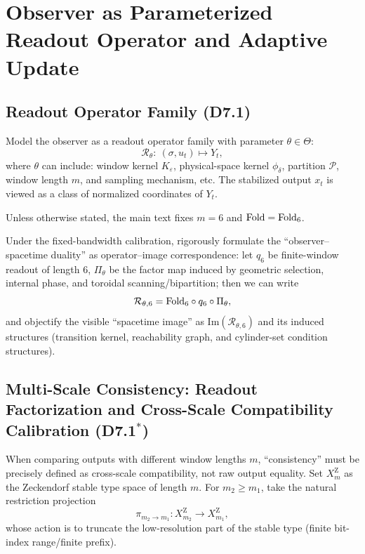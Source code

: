 \section{Observer as Parameterized Readout Operator and Adaptive Update}

\subsection{Readout Operator Family (D7.1)}

Model the observer as a readout operator family with parameter $\theta\in\Theta$:
\[
\mathcal{R}_{\theta}:\ (\sigma,u_t)\mapsto Y_t,
\]
where $\theta$ can include: window kernel $K_{\varepsilon}$, physical-space kernel $\phi_{\delta}$, partition $\mathcal{P}$, window length $m$, and sampling mechanism, etc. The stabilized output $x_t$ is viewed as a class of normalized coordinates of $Y_t$.

\begin{assumption}\label{assump:m6-fixed-framework}
Unless otherwise stated, the main text fixes $m=6$ and $\mathrm{Fold}=\mathrm{Fold}_6$.
\end{assumption}

Under the fixed-bandwidth calibration, rigorously formulate the ``observer--spacetime duality'' as operator--image correspondence: let $q_6$ be finite-window readout of length $6$, $\Pi_{\theta}$ be the factor map induced by geometric selection, internal phase, and toroidal scanning/bipartition; then we can write
$$
\mathcal{R}_{\theta,6}=\mathrm{Fold}_6\circ q_6\circ \Pi_{\theta},
$$
and objectify the visible ``spacetime image'' as $\mathrm{Im}(\mathcal{R}_{\theta,6})$ and its induced structures (transition kernel, reachability graph, and cylinder-set condition structures).

\subsection{Multi-Scale Consistency: Readout Factorization and Cross-Scale Compatibility Calibration (D7.1$^\ast$)}

When comparing outputs with different window lengths $m$, ``consistency'' must be precisely defined as cross-scale compatibility, not raw output equality. Set $X_m^{\mathrm Z}$ as the Zeckendorf stable type space of length $m$. For $m_2\ge m_1$, take the natural restriction projection
\[
\pi_{m_2\to m_1}:X_{m_2}^{\mathrm Z}\to X_{m_1}^{\mathrm Z},
\]
whose action is to truncate the low-resolution part of the stable type (finite bit-index range/finite prefix).

